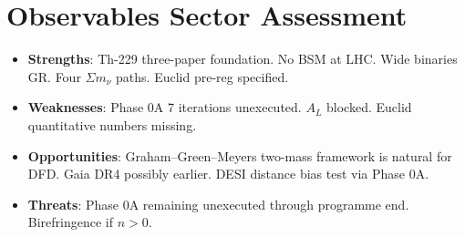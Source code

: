 \documentclass[11pt,a4paper]{article}
\begin{document}
\section{Observables Sector Assessment}

\begin{itemize}
\item \textbf{Strengths}: Th-229 three-paper foundation. No BSM at LHC. Wide binaries GR. Four $\Sigma m_\nu$ paths. Euclid pre-reg specified.
\item \textbf{Weaknesses}: Phase 0A 7 iterations unexecuted. $A_L$ blocked. Euclid quantitative numbers missing.
\item \textbf{Opportunities}: Graham--Green--Meyers two-mass framework is natural for DFD. Gaia DR4 possibly earlier. DESI distance bias test via Phase 0A.
\item \textbf{Threats}: Phase 0A remaining unexecuted through programme end. Birefringence if $n > 0$.
\end{itemize}
\end{document}
